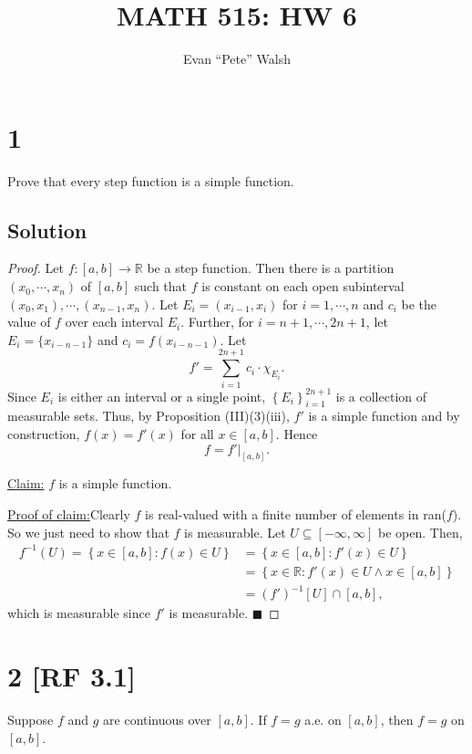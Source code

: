 \documentclass[12pt]{article}
\title{MATH 515: HW 6}
\author{Evan ``Pete'' Walsh}
\newenvironment{claimproof}[1]{\par\noindent\underline{Proof of claim:}\space#1}{\hfill $\blacksquare$\vspace{5mm}}
\begin{document}
\maketitle

\section*{1}
Prove that every step function is a simple function.

\subsection*{Solution}
\begin{proof}
Let $f : [a,b] \rightarrow \mathbb{R}$ be a step function. Then there is a partition $(x_{0}, \cdots, x_{n})$ of $[a,b]$ such that $f$ is constant on
each open subinterval $(x_{0}, x_{1}), \cdots, (x_{n-1}, x_{n})$. Let $E_{i} = (x_{i-1},x_{i})$ for $i = 1,\cdots, n$ and $c_{i}$ be the value of $f$
over each interval $E_{i}$. Further, for $i = n+1, \cdots, 2n+1$, let $E_{i} = \{x_{i-n-1}\}$ and $c_{i} = f(x_{i-n-1})$. Let 
\[ f' = \sum_{i=1}^{2n+1} c_{i}\cdot \chi_{E_{i}}. \]
Since $E_{i}$ is either an interval or a single point, $\left\{ E_{i} \right\}_{i=1}^{2n+1}$ is a collection of measurable sets. Thus, by Proposition
(III)(3)(iii), $f'$ is a simple function and by construction, $f(x) = f'(x)$ for all $x \in [a,b]$. Hence 
\[ f = f' \big|_{[a,b]}. \]

\underline{Claim:} $f$ is a simple function.
\begin{claimproof}
Clearly $f$ is real-valued with a finite number of elements in ran($f$). So we just need to show that $f$ is measurable. Let $U \subseteq [-\infty,
\infty]$ be open. Then,
\begin{align*}
f^{-1}(U) = \left\{ x \in [a,b] : f(x) \in U \right\} & = \left\{ x \in [a,b] : f'(x) \in U \right\} \\
& = \left\{ x \in \mathbb{R} : f'(x) \in U \wedge x \in [a,b] \right\} \\
& = (f')^{-1}[U] \cap [a,b],
\end{align*}
which is measurable since $f'$ is measurable.
\end{claimproof}

\end{proof}


\newpage 
\section*{2 [RF 3.1]}
Suppose $f$ and $g$ are continuous over $[a,b]$. If $f = g$ a.e. on $[a,b]$, then $f = g$ on $[a,b]$.
\end{document}
